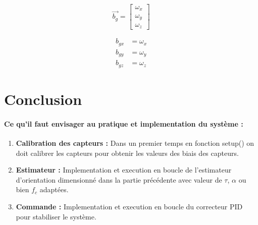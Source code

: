 \begin{equation}
	\vec{b_g} = \begin{bmatrix}
		\omega_x \\
		\omega_y \\
		\omega_z
	\end{bmatrix}
\end{equation}

\begin{align}
	b_{gx} &= \omega_x \\
	b_{gy} &= \omega_y \\
	b_{gz} &= \omega_z
\end{align}

\section{Conclusion}

\paragraph{Ce qu'il faut envisager au pratique et implementation du système :}

\begin{enumerate}
	\item \textbf{Calibration des capteurs :} Dans un premier temps en fonction setup() on doit calibrer les capteurs pour obtenir les valeurs des biais des capteurs.
	\item \textbf{Estimateur :} Implementation et execution en boucle de l'estimateur d'orientation dimensionné dans la partie précédente avec valeur de $\tau$, $\alpha$ ou bien $f_c$ adaptées.
	\item \textbf{Commande :} Implementation et execution en boucle du correcteur PID pour stabiliser le système.
\end{enumerate}
